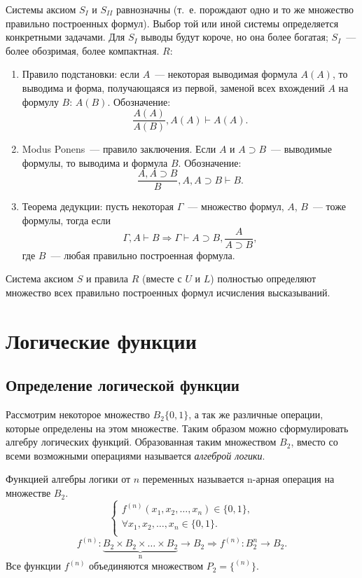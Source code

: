 \documentclass[a4paper,12pt]{report}
\begin{document}
	Системы аксиом $S_{I}$ и $S_{II}$ равнозначны (т.~е. порождают одно и то же
	множество правильно построенных формул). Выбор той или иной системы
	определяется конкретными задачами. Для $S_{I}$ выводы будут короче, но она
	более богатая; $S_{I}$~--- более обозримая, более компактная.
	$ R $:
	\begin{enumerate}
		\item Правило подстановки: если $ \textit{A} $~--- некоторая выводимая
			формула $ \textit{A}(A) $, то выводима и форма, получающаяся из первой,
			заменой всех вхождений $ \textit{A} $ на формулу $ \textit{B} $:
			$ \textit{A}(\textit{B}) $. Обозначение:
			$$ \frac{\textit{A}(A)}{\textit{A}(B)}, \textit{A}(A) \vdash
			\textit{A}(A). $$
		\item Modus Ponens~--- правило заключения. Если $ A $ и $ A \supset B $~---
			выводимые формулы, то выводима и формула $ B $. Обозначение:
			$$ \frac{A, A \supset B}{B}, A, A \supset B \vdash B. $$
		\item Теорема дедукции: пусть некоторая $ \Gamma $~--- множество формул, $
			A $, $ B $~--- тоже формулы, тогда если
			$$ \Gamma, A \vdash B \Rightarrow \Gamma \vdash A \supset B,
			\frac{A}{A \supset B}, $$
			где $ B $~--- любая правильно построенная формула.
	\end{enumerate}
	Система аксиом $ S $ и правила $ R $ (вместе с $ U $ и $ L $) полностью
	определяют множество всех правильно построенных формул исчисления
	высказываний.


\section{Логические функции}


\subsection{Определение логической функции}
	Рассмотрим некоторое множество $ B_2\{0,1\} $, а так же различные операции,
	которые определены на этом множестве. Таким образом можно сформулировать
	алгебру логических функций. Образованная таким множеством $ B_2 $, вместо со
	всеми возможными операциями называется \textit{алгеброй логики}.

	Функцией алгебры логики от $ n $ переменных называется n-арная операция
	на множестве $ B_2 $.
	$$
	\begin{cases}
		f^{(n)}(x_1, x_2, \dots, x_n) \in \{0, 1\},\\
		\forall x_1, x_2, \dots, x_n \in \{0, 1\}.\\
	\end{cases}
	$$
	$$
	f^{(n)}: \underbrace{B_2 \times B_2 \times \dots \times B_2}_\text{n}
	\rightarrow B_2 \Rightarrow f^{(n)} : B^n_2 \rightarrow B_2.
	$$
	Все функции $ f^{(n)} $ объединяются множеством $ P_2 = \{^{(n)}\} $.
\end{document}
